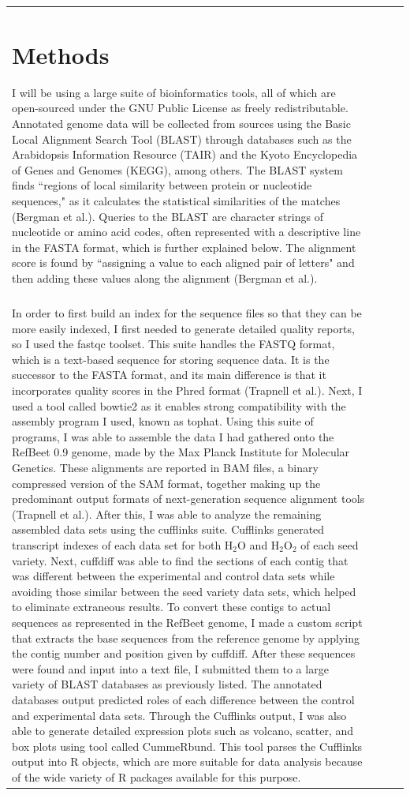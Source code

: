 \documentclass{article}
\begin{document}
\begin{tabular}{| l | c | c | r |}
\section{Methods}
	I will be using a large suite of bioinformatics tools, all of which are open-sourced under the GNU Public License as freely redistributable. Annotated genome data will be collected from sources using the Basic Local Alignment Search Tool (BLAST) through databases such as the Arabidopsis Information Resource (TAIR) and the Kyoto Encyclopedia of Genes and Genomes (KEGG), among others. The BLAST system finds ``regions of local similarity between protein or nucleotide sequences," as it calculates the statistical similarities of the matches (Bergman et al.). Queries to the BLAST are character strings of nucleotide or amino acid codes, often represented with a descriptive line in the FASTA format, which is further explained below. The alignment score is found by ``assigning a value to each aligned pair of letters"  and then adding these values along the alignment (Bergman et al.).\\\\
	In order to first build an index for the sequence files so that they can be more easily indexed, I first needed to generate detailed quality reports, so I used the fastqc toolset. This suite handles the FASTQ format, which is a text-based sequence for storing sequence data. It is the successor to the FASTA format, and its main difference is that it incorporates quality scores in the Phred format (Trapnell et al.). Next, I used a tool called bowtie2 as it enables strong compatibility with the assembly program I used, known as tophat. Using this suite of programs, I was able to assemble the data I had gathered onto the RefBeet 0.9 genome, made by the Max Planck Institute for Molecular Genetics. These alignments are reported in BAM files, a binary compressed version of the SAM format, together making up the predominant output formats of next-generation sequence alignment tools (Trapnell et al.). After this, I was able to analyze the remaining assembled data sets using the cufflinks suite. Cufflinks generated transcript indexes of each data set for both H$_{2}$O and H$_{2}$O$_{2}$ of each seed variety. Next, cuffdiff was able to find the sections of each contig that was different between the experimental and control data sets while avoiding those similar between the seed variety data sets, which helped to eliminate extraneous results. To convert these contigs to actual sequences as represented in the RefBeet genome, I made a custom script that extracts the base sequences from the reference genome by applying the contig number and position given by cuffdiff. After these sequences were found and input into a text file, I submitted them to a large variety of BLAST databases as previously listed. The annotated databases output predicted roles of each difference between the control and experimental data sets. Through the Cufflinks output, I was also able to generate detailed expression plots such as volcano, scatter, and box plots using tool called CummeRbund. This tool parses the Cufflinks output into R objects, which are more suitable for data analysis because of the wide variety of R packages available for this purpose.


\end{tabular}
\end{document}
